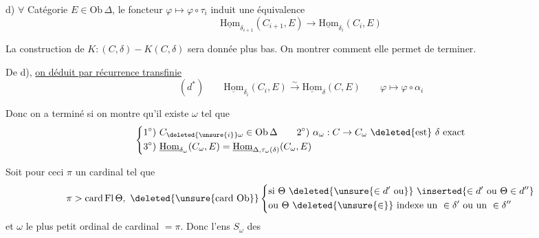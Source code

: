 
d) $\forall$ Catégorie $E\in\mathrm{Ob}\,\Delta$, le foncteur $\varphi\longmapsto\varphi\circ\tau_i$ induit une équivalence
\[
\underline{\mathrm{Hom}}_{\delta_{i+1}}(C_{i+1},E)\longrightarrow\underline{\mathrm{Hom}}_{\delta_i}(C_i,E)
\]

 La construction de $K:(C,\delta)- K(C,\delta)$ sera donnée plus bas. On   montrer comment elle permet de terminer.


De d), \uline{on déduit par récurrence transfinie}
\[
(d^*)\qquad\boxed{\underline{\mathrm{Hom}}_{\delta_i}(C_i,E)\xrightarrow{\sim}\underline{\mathrm{Hom}}_\delta(C,E)}\qquad \varphi\longmapsto\varphi\circ\alpha_i
\]

Donc on a terminé si on montre qu'il existe $\omega$  tel que
\[
\left\{\begin{aligned}
1^\circ)&\ C_{\deleted{\unsure{i}}\omega}\in\mathrm{Ob}\,\Delta\qquad 2^\circ)\ \alpha_\omega:C\to C_\omega\ \deleted{\text{est}}\ \delta\text{ exact}\\
3^\circ)&\ \underline{\mathrm{Hom}}_{\delta_\omega}(C_\omega,E)=\underline{\mathrm{Hom}}_{\Delta,\tau_\omega(\delta)}(C_\omega,E)
\end{aligned}\right.
\]

 Soit pour ceci $\pi$ un cardinal tel que
\[
\pi>\mathrm{card}\,\mathrm{Fl}\,\Theta,\ \deleted{\unsure{\text{card Ob}}}\left\{\begin{aligned}
&\text{si }\Theta\ \deleted{\unsure{\in d'\text{ ou}}}\ \inserted{\in d'\text{ ou }\Theta\in d''}\\
&\text{ou }\Theta\ \deleted{\unsure{\in}}\text{ indexe un }\in\delta'\text{ ou un }\in\delta''
\end{aligned}\right.
\]
et $\omega$ le plus petit ordinal de cardinal $=\pi$. Donc l'ens $S_\omega$ des

